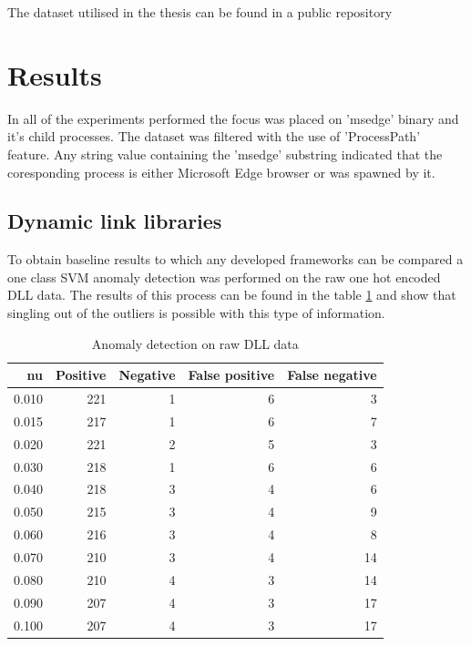 \documentclass[a4paper,twoside,12pt]{book}
\begin{document}
The dataset utilised in the thesis can be found in a public repository %


\section{Results}

In all of the experiments performed the focus was placed on 'msedge' binary and it's child processes.
The dataset was filtered with the use of 'ProcessPath' feature. Any string value containing the 'msedge'
substring indicated that the coresponding process is either Microsoft Edge browser or was spawned by it. 

\subsection{Dynamic link libraries}
To obtain baseline results to which any developed frameworks can be compared a one class SVM anomaly 
detection was performed on the raw one hot encoded DLL data. The results of this process can be found
in the table \ref{id:tab:rawDlls} and show that singling out of the outliers is possible with this type 
of information.

\begin{table}
	\centering
	\caption{Anomaly detection on raw DLL data}
	\label{id:tab:rawDlls}
\begin{tabular}{rrrrr}
	\toprule
		nu &  Positive &  Negative &  False positive &  False negative \\
	\midrule
	 0.010 &       221 &         1 &               6 &               3 \\
	 0.015 &       217 &         1 &               6 &               7 \\
	 0.020 &       221 &         2 &               5 &               3 \\
	 0.030 &       218 &         1 &               6 &               6 \\
	 0.040 &       218 &         3 &               4 &               6 \\
	 0.050 &       215 &         3 &               4 &               9 \\
	 0.060 &       216 &         3 &               4 &               8 \\
	 0.070 &       210 &         3 &               4 &              14 \\
	 0.080 &       210 &         4 &               3 &              14 \\
	 0.090 &       207 &         4 &               3 &              17 \\
	 0.100 &       207 &         4 &               3 &              17 \\
	\bottomrule
	\end{tabular}
\end{table}
	
\end{document}

